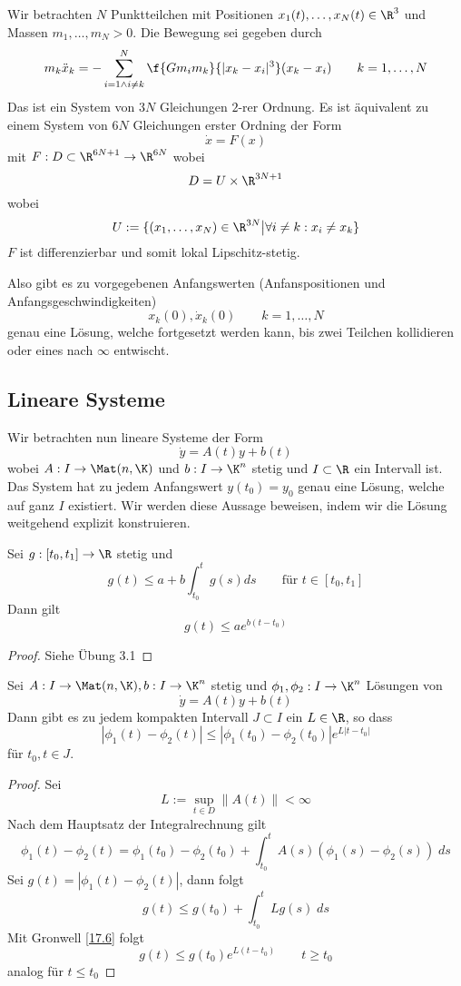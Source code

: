 \documentclass[a4paper,10pt]{scrartcl}
\begin{document}
\begin{ex*}
	Wir betrachten $N$ Punktteilchen mit Positionen $x_1(t),\dotsc, x_N(t)\in \R^3$ und Massen $m_1,\dotsc,m_N>0$.
	Die Bewegung sei gegeben durch
	\[
		m_k \ddot x_k = -\sum_{i=1 \land i\neq k}^N \f{Gm_im_k}{|x_k-x_i|^3}(x_k-x_i) \qquad k=1,\dotsc, N
	\]
	Das ist ein System von $3N$ Gleichungen $2$-rer Ordnung.
	Es ist äquivalent zu einem System von $6N$ Gleichungen erster Ordning der Form
	\[
		\dot x = F(x)
	\]
	mit $F:D\subset \R^{6N+1}\to \R^{6N}$ wobei
	\[
		D = U \times \R^{3N+1}
	\]
	wobei
	\[
		U := \{(x_1,\dotsc,x_N)\in \R^{3N}\big| \forall i\neq k: x_i\neq x_k \}
	\]
	$F$ ist differenzierbar und somit lokal Lipschitz-stetig.

	Also gibt es zu vorgegebenen Anfangswerten (Anfanspositionen und Anfangsgeschwindigkeiten)
	\[
		x_k(0), \dot x_k(0) \qquad k=1,\dotsc, N
	\]
	genau eine Lösung, welche fortgesetzt werden kann, bis zwei Teilchen kollidieren oder eines nach $\infty$ entwischt.
\end{ex*}


\subsection{Lineare Systeme}


Wir betrachten nun lineare Systeme der Form
\[
	\dot y = A(t) y + b(t)
\]
wobei $A: I \to \Mat(n,\K)$ und $b :I \to \K^n$ stetig und $I\subset \R$ ein Intervall ist.
Das System hat zu jedem Anfangswert $y(t_0) = y_0$ genau eine Lösung, welche auf ganz $I$ existiert.
Wir werden diese Aussage beweisen, indem wir die Lösung weitgehend explizit konstruieren.

\begin{lem}[Gronwell]
	\label{17.6}
	Sei $g: [t_0,t_1] \to \R$ stetig und
	\[
		g(t) \le a + b\int_{t_0}^t g(s) ds \qquad \text{für $t\in [t_0,t_1]$}
	\]
	Dann gilt
	\[
		g(t) \le ae^{b(t-t_0)}
	\]
	\begin{proof}	
		Siehe Übung 3.1
	\end{proof}
\end{lem}

\begin{st}
	\label{17.7}
	Sei $A:I \to \Mat(n,\K), b:I\to \K^n$ stetig und $\phi_1,\phi_2: I \to \K^n$ Lösungen von
	\[
		\dot y = A(t) y + b(t)
	\]
	Dann gibt es zu jedem kompakten Intervall $J\subset I$ ein $L\in \R$, so dass
	\[
		|\phi_1(t) - \phi_2(t)| \le |\phi_1(t_0) -\phi_2(t_0)| e^{L|t-t_0|}
	\]
	für $t_0, t\in J$.
	\begin{proof}
		Sei
		\[
			L := \sup_{t\in D}\|A(t)\| < \infty
		\]
		Nach dem Hauptsatz der Integralrechnung gilt
		\[
			\phi_1(t) - \phi_2(t) = \phi_1(t_0) - \phi_2(t_0) + \int_{t_0}^t A(s) (\phi_1(s) - \phi_2(s))\; ds
		\]
		Sei $g(t) = |\phi_1(t) - \phi_2(t)|$, dann folgt
		\[
			g(t) \le g(t_0) + \int_{t_0}^tLg(s)\; ds
		\]
		Mit Gronwell \ref{17.6} folgt
		\[
			g(t) \le g(t_0) e^{L(t-t_0)} \qquad t\ge t_0
		\]
		analog für $t\le t_0$

	\end{proof}
\end{st}
\end{document}
